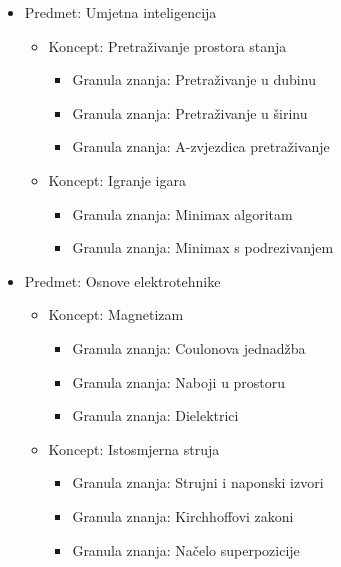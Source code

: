 \documentclass[times, utf8, zavrsni]{fer}
\begin{document}
\begin{itemize}
	\item Predmet: Umjetna inteligencija
	\begin{itemize}
		\item Koncept: Pretraživanje prostora stanja
		\begin{itemize}
			\item Granula znanja: Pretraživanje u dubinu
			\item Granula znanja: Pretraživanje u širinu
			\item Granula znanja: A-zvjezdica pretraživanje
		\end{itemize}
		\item Koncept: Igranje igara
			\begin{itemize}
				\item Granula znanja: Minimax algoritam
				\item Granula znanja: Minimax s podrezivanjem
			\end{itemize}
	\end{itemize}
	\item Predmet: Osnove elektrotehnike
	\begin{itemize}
		\item Koncept: Magnetizam
		\begin{itemize}
			\item Granula znanja: Coulonova jednadžba
			\item Granula znanja: Naboji u prostoru
			\item Granula znanja: Dielektrici
		\end{itemize}
		\item Koncept: Istosmjerna struja
		\begin{itemize}
			\item Granula znanja: Strujni i naponski izvori
			\item Granula znanja: Kirchhoffovi zakoni
			\item Granula znanja: Načelo superpozicije
		\end{itemize}
	\end{itemize}
\end{itemize}
\end{document}
